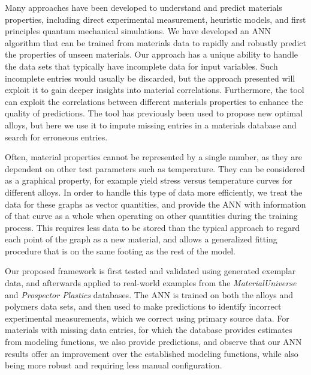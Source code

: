 \documentclass[review]{elsarticle}
\newcommand{\change}[1]{#1}
\begin{document}
Many approaches have been developed to understand and predict materials
properties, including direct experimental measurement\cite{Zhang08},
heuristic models, and first principles quantum mechanical
simulations\cite{Tadmor11}. We have developed an ANN algorithm that can be
trained from materials data to rapidly and robustly predict the properties
of unseen materials.\cite{conduit17} Our approach has a unique ability to
handle the data sets \change{that typically have incomplete data for input
  variables.}  \change{Such} incomplete \change{entries} would usually be
discarded, but the approach presented will exploit it to gain deeper
insights into material correlations. Furthermore, the tool can exploit the
correlations between different materials properties to enhance the quality
of predictions. The tool has previously been used to propose new optimal
alloys\cite{conduit17,Conduit2013ii,Conduit2013iii,Conduit2014v,Conduit2014vi,Conduit2014vii},
but here we use it to impute missing entries in a materials database and
search for erroneous entries.

Often, material properties cannot be represented by a single number, as they
are dependent on other test parameters such as temperature. They can be
considered as a graphical property, for example yield stress versus
temperature curves for different alloys\cite{Ritchie73}. In order to handle
this type of data more efficiently, we treat the data for these graphs as
vector quantities, and provide the ANN with information of that curve as a
whole when operating on other quantities during the training
process. \change{This requires less data to be stored than the typical
approach to regard each point of the graph as a new material, and allows a
generalized fitting procedure that is on the same footing as the rest of
the model.}

Our proposed framework is first tested and validated using generated
exemplar data, and afterwards applied to real-world examples from the
\textit{MaterialUniverse} and \textit{Prospector Plastics} databases. The
ANN is trained on both the alloys and polymers data sets, and then used to
make predictions to identify incorrect experimental measurements, which we
correct using primary source data. For materials with missing data entries,
for which the database provides estimates from modeling functions, we also
provide predictions, and observe that our ANN results offer an improvement
over the established modeling functions, while also being more robust and
requiring less manual configuration.
\end{document}
